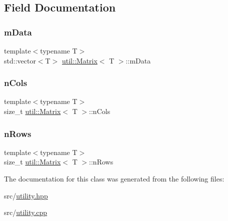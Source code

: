 \subsection{Field Documentation}
\mbox{\label{classutil_1_1Matrix_ad8ef42880d189249c526aca3825be2cf}} 
\subsubsection{\texorpdfstring{m\+Data}{mData}}
{\footnotesize\ttfamily template$<$typename T$>$ \\
std\+::vector$<$T$>$ \hyperlink{classutil_1_1Matrix}{util\+::\+Matrix}$<$ T $>$\+::m\+Data\hspace{0.3cm}{\ttfamily [private]}}

\mbox{\label{classutil_1_1Matrix_ae93dd1e2ede96c42b2035a69e4a14083}} 
\subsubsection{\texorpdfstring{n\+Cols}{nCols}}
{\footnotesize\ttfamily template$<$typename T$>$ \\
size\+\_\+t \hyperlink{classutil_1_1Matrix}{util\+::\+Matrix}$<$ T $>$\+::n\+Cols\hspace{0.3cm}{\ttfamily [private]}}

\mbox{\label{classutil_1_1Matrix_a1d981a6aa70209f8cf1e3fb7a0820240}} 
\subsubsection{\texorpdfstring{n\+Rows}{nRows}}
{\footnotesize\ttfamily template$<$typename T$>$ \\
size\+\_\+t \hyperlink{classutil_1_1Matrix}{util\+::\+Matrix}$<$ T $>$\+::n\+Rows\hspace{0.3cm}{\ttfamily [private]}}



The documentation for this class was generated from the following files\+:\begin{DoxyCompactItemize}
\item 
src/\hyperlink{utility_8hpp}{utility.\+hpp}\item 
src/\hyperlink{utility_8cpp}{utility.\+cpp}\end{DoxyCompactItemize}
